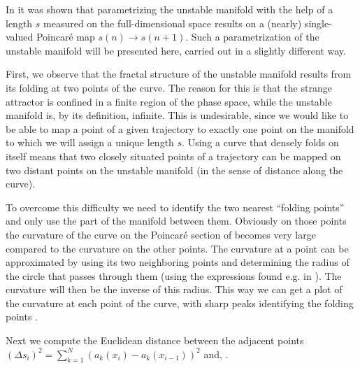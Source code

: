 \documentclass[pre,preprint,groupedaddress,showpacs,showkeys]{revtex4}
\begin{document}
  In \cite{Christiansen:97} it was shown that parametrizing the unstable manifold with
  the help of a length $s$ measured on the full-dimensional space
  results on a (nearly) single-valued Poincar\'e map   $s(n) \rightarrow
  s(n+1)$. Such a parametrization of the
  unstable manifold will be presented here, carried out in a slightly
  different way.

  First, we observe that the fractal structure of the unstable
  manifold results from its folding at two points of the curve. The
  reason for this is that the strange attractor is confined in a
  finite region of the phase space, while the unstable manifold is, by
  its definition, infinite.
  This is undesirable, since we would like to be able to map a
  point of a given trajectory to exactly one point on the manifold to
  which we will assign a unique length $s$. Using a curve that densely
  folds on itself means that two closely situated points of a
  trajectory can be mapped on two distant points on the unstable
  manifold (in the sense of distance along the curve).

  To overcome this difficulty we need to identify the two nearest ``folding points'' and only
  use the part of the manifold between them. Obviously on those
  points the curvature of the curve on the Poincar\'e section of
   becomes very large compared to the curvature
  on the other points. The curvature at a point can be approximated by
  using its two neighboring points and determining the radius of the
  circle that passes through them (using the expressions found e.g. in
  \cite{circle}). The curvature will then be the
  inverse of this radius. This way we can get a plot of the curvature at
  each point of the curve, with sharp peaks identifying the folding
  points .

  Next we compute the Euclidean distance between the
  adjacent points $(\Delta s_i)^2=\sum_{k=1}^N \left(a_k(x_i)-a_k(x_{i-1})\right)^2$ and,
  .
\end{document}

